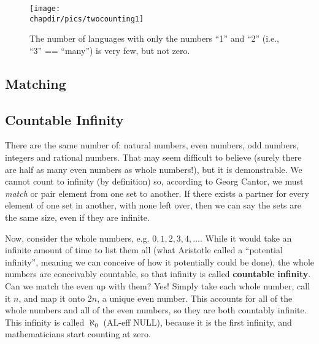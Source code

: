 
\begin{figure}
\begin{centering}
\texttt{[image: \\chapdir/pics/twocounting1]}
\caption[Languages with only two numbers]{The number of languages with only the numbers ``1'' and ``2'' (i.e., ``3'' == ``many'') is very few, but not zero.}
\end{centering}
\end{figure}

\subsection{Matching}


\subsection{Countable Infinity}
There are the same number of: natural numbers, even numbers, odd numbers, integers and
rational numbers.  That may seem difficult to believe (surely there are half as many even numbers
as whole numbers!), but it is demonstrable.  We cannot count to infinity (by definition) so,
according to Georg Cantor, we must \emph{match} or pair element from one set to another.
If there exists a partner for every element of one set in another, with none left over, then
we can say the sets are the same size, even if they are infinite.


Now, consider the whole numbers, e.g. $0, 1, 2, 3, 4, \dots$.  While it would take an infinite 
amount of time to list them all (what Aristotle called a ``potential infinity'', meaning we can
conceive of how it potentially could be done), the whole numbers are conceivably countable,
so that infinity is called \textbf{countable infinity}.  Can we match the even up with them?
Yes!  Simply take each whole number, call it $n$, and map it onto $2n$, a unique even 
number.  This accounts for all of the whole numbers and all of the even numbers, so 
they are both countably infinite.  This infinity is called $\aleph_0$ (AL-eff NULL), because
it is the first infinity, and mathematicians start counting at zero.

